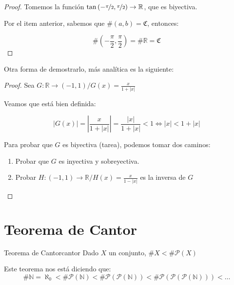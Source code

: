 \begin{itemize}
\begin{proof}
            Tomemos la función $\tan{(- \nicefrac{\pi}{2}, \nicefrac{\pi}{2})}
            \to \mathbb{R}$, que es biyectiva.

            Por el item anterior, sabemos que $\# (a,b) = \mathfrak{C}$, 
            entonces:

            \[ \# \left(-\frac{\pi}{2}, \frac{\pi}{2}\right) 
            = \# \mathbb{R} = \mathfrak{C} \]

        \end{proof}
        
        Otra forma de demostrarlo, más analítica es la siguiente:

        \begin{proof}\phantom{.}

            Sea $G: \mathbb{R} \to (-1,1) / G(x) = \frac{x}{1+|x|}$

            Veamos que está bien definida:

            \[ |G(x)| = \left| \frac{x}{1+|x|} \right| 
            = \frac{|x|}{1+|x|} < 1 \iff |x| < 1 + |x| \]

            Para probar que $G$ es biyectiva (tarea), podemos tomar dos 
            caminos:

            \begin{enumerate}
                \item Probar que $G$ es inyectiva y sobreyectiva.
                \item Probar $H: (-1,1) \to \mathbb{R} / 
                    H(x) = \frac{x}{1-|x|}$ es la inversa de $G$
            \end{enumerate}
            
        \end{proof}
\end{itemize}


\section{Teorema de Cantor}

\begin{teorema}{Teorema de Cantor}{cantor}
    Dado $X$ un conjunto, $\# X < \# \mathcal{P}(X)$
\end{teorema}


Este teorema nos está diciendo que:
\[ \# \mathbb{N} = \aleph_0
    < \# \mathcal{P}(\mathbb{N})
    < \# \mathcal{P}(\mathcal{P}(\mathbb{N}))
    < \# \mathcal{P}(\mathcal{P}(\mathcal{P}(\mathbb{N})))
    < \dots \]

